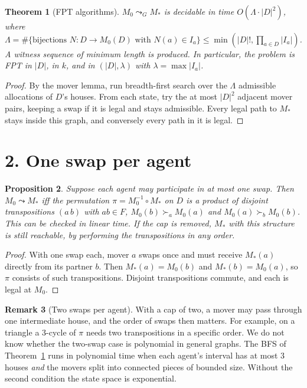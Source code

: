 \documentclass[11pt]{article}
\newtheorem{theorem}{Theorem}
\newtheorem{proposition}[theorem]{Proposition}
\theoremstyle{definition}
\newtheorem{remark}[theorem]{Remark}
\begin{document}
\begin{theorem}[FPT algorithms]\label{thm:fpt}
$M_0\leadsto_GM_*$ is decidable in time $O(\Lambda\cdot|D|^2)$, where
$\Lambda=\#\{\text{bijections }N:D\to M_0(D)\text{ with }N(a)\in I_a\}\le\min(|D|!,\prod_{a\in D}|I_a|)$.
A witness sequence of minimum length is produced. In particular, the problem is FPT in $|D|$, in $k$, and in
$(|D|,\lambda)$ with $\lambda=\max|I_a|$.
\end{theorem}
\begin{proof}
By the mover lemma, run breadth-first search over the $\Lambda$ admissible allocations of $D$'s houses. From each state,
try the at most $|D|^2$ adjacent mover pairs, keeping a swap if it is legal and stays admissible. Every legal path to $M_*$
stays inside this graph, and conversely every path in it is legal.
\end{proof}

\section*{2. One swap per agent}
\begin{proposition}\label{prop:one}
Suppose each agent may participate in at most one swap. Then $M_0\leadsto M_*$ iff the permutation
$\pi=M_0^{-1}\circ M_*$ on $D$ is a product of disjoint transpositions $(a\,b)$ with $ab\in F$,
$M_0(b)\succ_aM_0(a)$ and $M_0(a)\succ_bM_0(b)$. This can be checked in linear time. If the cap is removed, $M_*$ with this
structure is still reachable, by performing the transpositions in any order.
\end{proposition}
\begin{proof}
With one swap each, mover $a$ swaps once and must receive $M_*(a)$ directly from its partner $b$. Then $M_*(a)=M_0(b)$ and
$M_*(b)=M_0(a)$, so $\pi$ consists of such transpositions. Disjoint transpositions commute, and each is legal at $M_0$.
\end{proof}

\begin{remark}[Two swaps per agent]
With a cap of two, a mover may pass through one intermediate house, and the order of swaps then matters. For example,
on a triangle a 3-cycle of $\pi$ needs two transpositions in a specific order. We do not know whether the two-swap case
is polynomial in general graphs. The BFS of Theorem~\ref{thm:fpt} runs in polynomial time when each agent's
interval has at most $3$ houses \emph{and} the movers split into connected pieces of bounded size. Without the second
condition the state space is exponential.
\end{remark}
\end{document}
